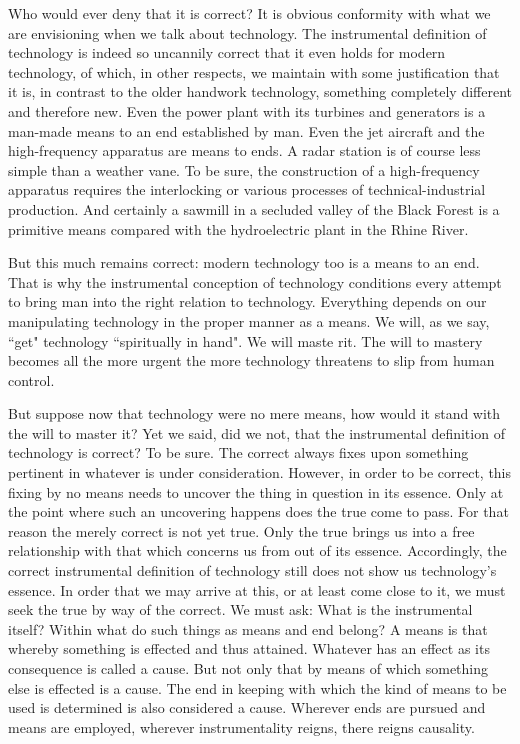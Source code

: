 Who would ever deny that it is correct? It is obvious conformity with what we are envisioning when we talk about technology. The instrumental definition of technology is indeed so uncannily correct that it even holds for modern technology, of which, in other respects, we maintain with some justification that it is, in contrast to the older handwork technology, something completely different and therefore new. Even the power plant with its turbines and generators is a man-made means to an end established by man. Even the jet aircraft and the high-frequency apparatus are means to ends. A radar station is of course less simple than a weather vane. To be sure, the construction of a high-frequency apparatus requires the interlocking or various processes of technical-industrial production. And certainly a sawmill in a secluded valley of the Black Forest is a primitive means compared with the hydroelectric plant in the Rhine River.

But this much remains correct: modern technology too is a means to an end. That is why the instrumental conception of technology conditions every attempt to bring man into the right relation to technology. Everything depends on our manipulating technology in the proper manner as a means. We will, as we say, ``get" technology ``spiritually in hand". We will maste rit. The will to mastery becomes all the more urgent the more technology threatens to slip from human control.

But suppose now that technology were no mere means, how would it stand with the will to master it? Yet we said, did we not, that the instrumental definition of technology is correct? To be sure. The correct always fixes upon something pertinent in whatever is under consideration. However, in order to be correct, this fixing by no means needs to uncover the thing in question in its essence. Only at the point where such an uncovering happens does the true come to pass. For that reason the merely correct is not yet true. Only the true brings us into a free relationship with that which concerns us from out of its essence. Accordingly, the correct instrumental definition of technology still does not show us technology's essence. In order that we may arrive at this, or at least come close to it, we must seek the true by way of the correct. We must ask: What is the instrumental itself? Within what do such things as means and end belong? A means is that whereby something is effected and thus attained. Whatever has an effect as its consequence is called a cause. But not only that by means of which something else is effected is a cause. The end in keeping with which the kind of means to be used is determined is also considered a cause. Wherever ends are pursued and means are employed, wherever instrumentality reigns, there reigns causality.

